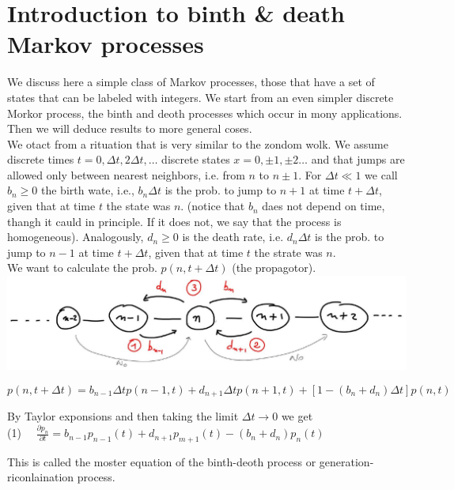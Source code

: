 \documentclass[10pt]{article}
\begin{document}
\section*{Introduction to binth \& death Markov processes}
We discuss here a simple class of Markov processes, those that have a set of states that can be labeled with integers. We start from an even simpler discrete Morkor process, the binth and deoth processes which occur in mony applications. Then we will deduce results to more general coses.\\
We otact from a rituation that is very similar to the zondom wolk. We assume discrete times $t=0, \Delta t, 2 \Delta t, \ldots$ discrete states $x=0, \pm 1, \pm 2 \ldots$ and that jumps are allowed only between nearest neighbors, i.e. from $n$ to $n \pm 1$. For $\Delta t \ll 1$ we call $b_{n} \geqslant 0$ the birth wate, i.e., $b_{n} \Delta t$ is the prob. to jump to $n+1$ at time $t+\Delta t$, given that at time $t$ the state was $n$. (notice that $b_{n}$ daes not depend on time, thangh it cauld in principle. If it does not, we say that the process is homogeneous). Analogously, $d_{n} \geqslant 0$ is the death rate, i.e. $d_{n} \Delta t$ is the prob. to jump to $n-1$ at time $t+\Delta t$, given that at time $t$ the strate was $n$.\\
We want to calculate the prob. $p(n, t+\Delta t)$ (the propagotor).\\
\includegraphics[max width=\textwidth, center]{2025_10_17_b1062645fdca57c84af1g-01}


\begin{equation*}
p(n, t+\Delta t)=b_{n-1} \Delta t p(n-1, t)+d_{n+1} \Delta t p(n+1, t)+\left[1-\left(b_{n}+d_{n}\right) \Delta t\right] p(n, t) \tag{1}
\end{equation*}


By Taylor exponsions and then taking the limit $\Delta t \rightarrow 0$ we get\\
(1) $\quad \frac{\partial p_{n}}{\partial t}=b_{n-1} p_{n-1}(t)+d_{n+1} p_{m+1}(t)-\left(b_{n}+d_{n}\right) p_{n}(t)$

This is called the moster equation of the binth-deoth process or generation-riconlaination process.
\end{document}

